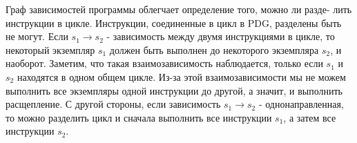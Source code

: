 Граф зависимостей программы облегчает определение того, можно ли разде- лить инструкции в цикле. Инструкции, соединенные в цикл в PDG, разделены быть не могут. Если $s_{1} \to s_{2}$ - зависимость между двумя инструкциями в цикле, то некоторый экземпляр $s_{1}$ должен быть выполнен до некоторого экземпляра $s_{2}$, и наоборот. Заметим, что такая взаимозависимость наблюдается, только если $s_{1}$ и $s_{2}$ находятся в одном общем цикле. Из-за этой взаимозависимости мы не можем выполнить все экземпляры одной инструкции до другой, а значит, и выполнить расщепление. С другой стороны, если зависимость $s_{1} \to s_{2}$ - однонаправленная, то можно разделить цикл и сначала выполнить все инструкции $s_{1}$, а затем все инструкции $s_{2}$.